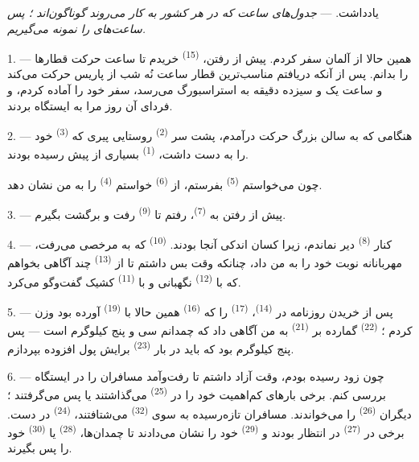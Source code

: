 \VUsaut{4.0mm}
\VUsaut{2.4mm}
\VUsaut{3.4mm}
\textsc{یادداشت.} --- \textit{جدول‌های ساعت که در هر کشور به کار
می‌روند گوناگون‌اند ؛ پس ساعت‌های} 
\textit{را نمونه می‌گیریم.}

1. --- همین حالا از آلمان سفر کردم. پیش از رفتن، 
\textsuperscript{(15)} خریدم تا ساعت حرکت قطارها را بدانم. پس از آنکه
دریافتم مناسب‌ترین قطار ساعت نُه شب از پاریس حرکت می‌کند و ساعت یک و
سیزده دقیقه به استراسبورگ می‌رسد، سفر خود را آماده کردم، و فردای آن
روز مرا به ایستگاه بردند.

2. --- هنگامی که به سالن بزرگ حرکت درآمدم، پشت سر 
\textsuperscript{(2)} روستایی پیری که 
\textsuperscript{(3)} خود را به دست داشت، 
\textsuperscript{(1)} بسیاری از پیش رسیده بودند.

چون می‌خواستم  \textsuperscript{(5)} بفرستم، از
 \textsuperscript{(6)} خواستم 
\textsuperscript{(4)} را به من نشان دهد.

3. --- پیش از رفتن به  \textsuperscript{(7)}، رفتم
تا  \textsuperscript{(9)} رفت و برگشت بگیرم.

4. --- کنار  \textsuperscript{(8)} دیر نماندم، زیرا کسان
اندکی آنجا بودند.  \textsuperscript{(10)} که به مرخصی
می‌رفت، مهربانانه نوبت خود را به من داد، چنانکه وقت بس داشتم تا از
 \textsuperscript{(13)} چند آگاهی بخواهم که با
 \textsuperscript{(12)} نگهبانی و با 
\textsuperscript{(11)} کشیک گفت‌وگو می‌کرد.

\VUsaut{3.0mm}
\VUsaut{3.0mm}

5. --- پس از خریدن روزنامه در  \textsuperscript{(14)}،
 \textsuperscript{(17)} را که 
\textsuperscript{(16)} همین حالا با 
\textsuperscript{(19)} آورده بود وزن کردم ؛ 
\textsuperscript{(22)} گمارده بر  \textsuperscript{(21)}
به من آگاهی داد که چمدانم سی و پنج کیلوگرم است — پس پنج کیلوگرم
 بود که باید در  بار
\textsuperscript{(23)} برایش پول افزوده بپردازم.

6. --- چون زود رسیده بودم، وقت آزاد داشتم تا رفت‌وآمد مسافران را در
ایستگاه بررسی کنم. برخی بارهای کم‌اهمیت خود را در 
\textsuperscript{(25)} می‌گذاشتند یا پس می‌گرفتند ؛ دیگران
 \textsuperscript{(26)} را می‌خواندند. مسافران
تازه‌رسیده به سوی  \textsuperscript{(32)} می‌شتافتند،
 \textsuperscript{(24)} در دست. برخی در  \textsuperscript{(27)} در انتظار بودند و 
\textsuperscript{(29)} خود را نشان می‌دادند تا چمدان‌ها،
 \textsuperscript{(28)} یا 
\textsuperscript{(30)} خود را پس بگیرند.

